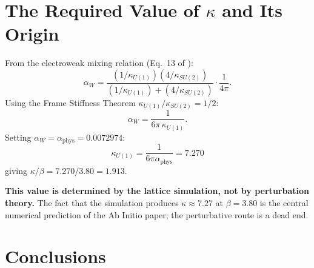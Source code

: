 \documentclass[11pt]{article}
\begin{document}
\section{The Required Value of $\kappa$ and Its Origin}

From the electroweak mixing relation (Eq.~13 of \cite{Alcock2025}):
\begin{equation}
  \alpha_W = \frac{(1/\kappa_{U(1)})(4/\kappa_{SU(2)})}
             {(1/\kappa_{U(1)}) + (4/\kappa_{SU(2)})} \cdot \frac{1}{4\pi}.
\end{equation}
Using the Frame Stiffness Theorem $\kappa_{U(1)}/\kappa_{SU(2)} = 1/2$:
\begin{equation}
  \alpha_W = \frac{1}{6\pi\,\kappa_{U(1)}}.
\end{equation}
Setting $\alpha_W = \alpha_{\text{phys}} = 0.0072974$:
\begin{equation}\label{eq:kappa_required}
  \boxed{\kappa_{U(1)} = \frac{1}{6\pi\alpha_{\text{phys}}} = 7.270}
\end{equation}
giving $\kappa/\beta = 7.270/3.80 = 1.913$.

\medskip
\noindent\textbf{This value is determined by the lattice simulation,
not by perturbation theory.}  The fact that the simulation produces
$\kappa \approx 7.27$ at $\beta = 3.80$ is the central numerical
prediction of the Ab Initio paper; the perturbative route is a dead end.


\section{Conclusions}
\end{document}

